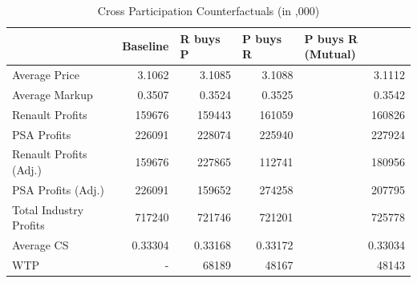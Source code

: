 \documentclass[a4paper,12pt]{article}
\begin{document}
\begin{table}[h!]
    \centering
    \caption{Cross Participation Counterfactuals (in ,000)}
    \begin{tabular}{lrrrr}
        \hline \hline


                           & \multicolumn{1}{l}{Baseline} & \multicolumn{1}{l}{R buys P} & \multicolumn{1}{l}{P buys R} & \multicolumn{1}{l}{P buys R (Mutual)}  \\ 
    \hline     Average Price          & 3.1062                       & 3.1085                       & 3.1088                       & 3.1112                                 \\ 
    Average Markup         & 0.3507                       & 0.3524                       & 0.3525                       & 0.3542                                 \\
    Renault Profits        & 159676                       & 159443                       & 161059                       & 160826                                 \\
    PSA Profits            & 226091                       & 228074                       & 225940                       & 227924                                 \\
    Renault Profits (Adj.) & 159676                       & 227865                       & 112741                       & 180956                                 \\
    PSA Profits (Adj.)     & 226091                       & 159652                       & 274258                       & 207795                                 \\
    Total Industry Profits & 717240                       & 721746                       & 721201                       & 725778                                 \\
    Average CS             & 0.33304                      & 0.33168                      & 0.33172                      & 0.33034                                \\
    WTP                    & -         & 68189                        & 48167                        & 48143 \\
    \hline\hline                                
    \end{tabular}
    \label{m3}
\end{table}
\end{document}
